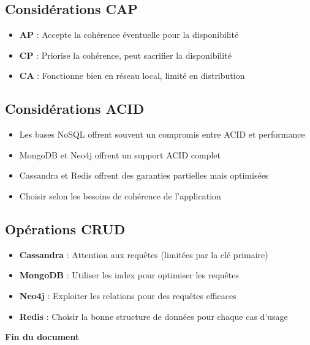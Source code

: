 \documentclass[11pt,a4paper]{article}
\begin{document}
\subsection{Considérations CAP}

\begin{itemize}
    \item \textbf{AP} : Accepte la cohérence éventuelle pour la disponibilité
    \item \textbf{CP} : Priorise la cohérence, peut sacrifier la disponibilité
    \item \textbf{CA} : Fonctionne bien en réseau local, limité en distribution
\end{itemize}

\subsection{Considérations ACID}

\begin{itemize}
    \item Les bases NoSQL offrent souvent un compromis entre ACID et performance
    \item MongoDB et Neo4j offrent un support ACID complet
    \item Cassandra et Redis offrent des garanties partielles mais optimisées
    \item Choisir selon les besoins de cohérence de l'application
\end{itemize}

\subsection{Opérations CRUD}

\begin{itemize}
    \item \textbf{Cassandra} : Attention aux requêtes (limitées par la clé primaire)
    \item \textbf{MongoDB} : Utiliser les index pour optimiser les requêtes
    \item \textbf{Neo4j} : Exploiter les relations pour des requêtes efficaces
    \item \textbf{Redis} : Choisir la bonne structure de données pour chaque cas d'usage
\end{itemize}

\vspace{2cm}

\begin{center}
\textbf{Fin du document}
\end{center}
\end{document}
